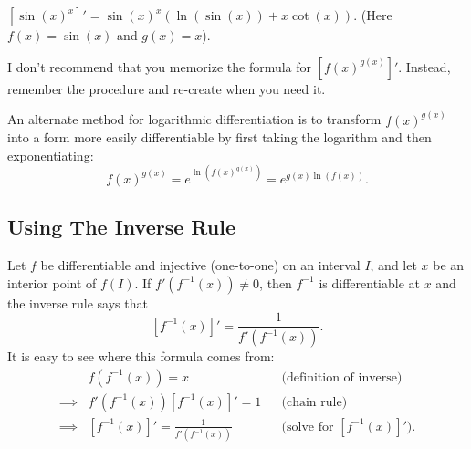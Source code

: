 \begin{exampleblock}
$[\sin(x)^x]'=\sin(x)^x(\ln(\sin(x))+x\cot(x))$. (Here $f(x)=\sin(x)$ and $g(x)=x$).
\end{exampleblock}

I don't recommend that you memorize the formula for $[f(x)^{g(x)}]'$. Instead, remember the procedure and re-create when you need it.

An alternate method for logarithmic differentiation is to transform $f(x)^{g(x)}$ into a form more easily differentiable by first taking the logarithm and then exponentiating:
$$f(x)^{g(x)}=e^{\ln\left(f(x)^{g(x)}\right)}=e^{g(x)\ln(f(x))}.$$
\subsection{Using The Inverse Rule}

Let $f$ be differentiable and injective (one-to-one) on an interval $I$, and let $x$ be an
interior point of $f(I)$. If $f'(f^{-1}(x))\ne0$, then $f^{-1}$ is
differentiable at $x$ and the inverse rule says that
$$[f^{-1}(x)]'=\frac{1}{f'(f^{-1}(x))}.$$
It is easy to see where this formula comes from:
\begin{align*}
         & f(f^{-1}(x)) = x & & \text{(definition of inverse)}\\
\implies & f'(f^{-1}(x))[f^{-1}(x)]'=1 & &\text{(chain rule)}\\
\implies & [f^{-1}(x)]' =\frac{1}{f'(f^{-1}(x))} & & \text{(solve for $[f^{-1}(x)]'$)}.
\end{align*}


